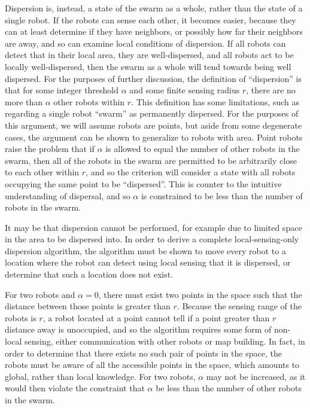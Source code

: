 Dispersion is, instead, a state of the swarm as a whole, rather than the state of a single robot. 
If the robots can sense each other, it becomes easier, because they can at least determine if they have neighbors, or possibly how far their neighbors are away, and so can examine local conditions of dispersion. If all robots can detect that in their local area, they are well-dispersed, and all robots act to be locally well-dispersed, then the swarm as a whole will tend towards being well dispersed. 
For the purposes of further discussion, the definition of ``dispersion'' is that for some integer threshold $\alpha$ and some finite sensing radius $r$, there are no more than $\alpha$ other robots within $r$. 
This definition has some limitations, such as regarding a single robot ``swarm'' as permanently dispersed. 
For the purposes of this argument, we will assume robots are points, but aside from some degenerate cases, the argument can be shown to generalize to robots with area. 
Point robots raise the problem that if $\alpha$ is allowed to equal the number of other robots in the swarm, then all of the robots in the swarm are permitted to be arbitrarily close to each other within $r$, and so the criterion will consider a state with all robots occupying the same point to be ``dispersed''. 
This is counter to the intuitive understanding of dispersal, and so $\alpha$ is constrained to be less than the number of robots in the swarm. 

It may be that dispersion cannot be performed, for example due to limited space in the area to be dispersed into. 
In order to derive a complete local-sensing-only dispersion algorithm, the algorithm must be shown to move every robot to a location where the robot can detect using local sensing that it is dispersed, or determine that such a location does not exist.

For two robots and $\alpha = 0$, there must exist two points in the space such that the distance between those points is greater than $r$. 
Because the sensing range of the robots is $r$, a robot located at a point cannot tell if a point greater than $r$ distance away is unoccupied, and so the algorithm requires some form of non-local sensing, either communication with other robots or map building. 
In fact, in order to determine that there exists no such pair of points in the space, the robots must be aware of all the accessible points in the space, which amounts to global, rather than local knowledge.%
For two robots, $\alpha$ may not be increased, as it would then violate the constraint that $\alpha$ be less than the number of other robots in the swarm. 

